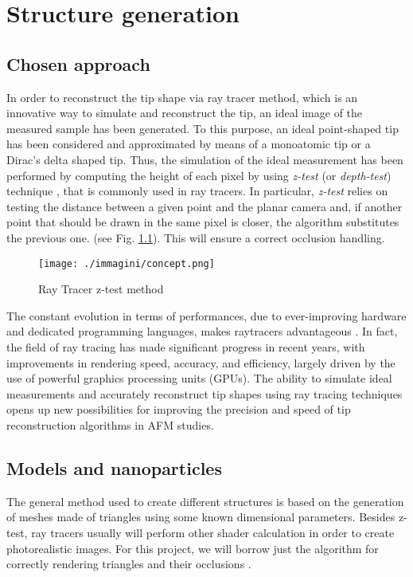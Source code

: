 \chapter{Structure generation}

\section{Chosen approach}

In order to reconstruct the tip shape via ray tracer method, which is an innovative way to simulate and reconstruct the tip, an ideal image of the measured sample has been generated. To this purpose, an ideal point-shaped tip has been considered and approximated by means of a monoatomic tip or a Dirac's delta shaped tip. Thus, the simulation of the ideal measurement has been performed by computing the height of each pixel by using \textit{z-test} (or \textit{depth-test}) technique \cite{raycasting_ztest}, that is commonly used in ray tracers. In particular, \textit{z-test} relies on testing the distance between a given point and the planar camera and, if another point that should be drawn in the same pixel is closer, the algorithm substitutes the previous one. (see Fig. \ref{fig:concept}). This will ensure a correct occlusion handling.

\begin{figure}[ht]
    \centering
    \texttt{[image: ./immagini/concept.png]}
    \caption{Ray Tracer z-test method}
    \label{fig:concept}
\end{figure}

\newpage

The constant evolution in terms of performances, due to ever-improving hardware and dedicated programming languages, makes raytracers advantageous \cite{GPU_language}. In fact, the field of ray tracing has made significant progress in recent years, with improvements in rendering speed, accuracy, and efficiency, largely driven by the use of powerful graphics processing units (GPUs). The ability to simulate ideal measurements and accurately reconstruct tip shapes using ray tracing techniques opens up new possibilities for improving the precision and speed of tip reconstruction algorithms in AFM studies.

\section{Models and nanoparticles}

The general method used to create different structures is based on the generation of meshes made of triangles using some known dimensional parameters. Besides z-test, ray tracers usually will perform other shader calculation in order to create photorealistic images. For this project, we will borrow just the algorithm for correctly rendering triangles and their occlusions \cite{raytracer1,raytracer2}.

